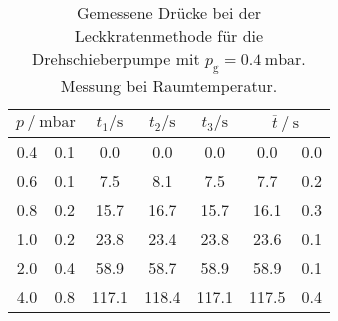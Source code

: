 \begin{table} 
\centering 
\caption{Gemessene Drücke bei der Leckkratenmethode für die Drehschieberpumpe mit $p_{\mathrm{g}}=\SI{0.4}{\milli\bar}$. Messung bei Raumtemperatur.} 
\label{tab: leck_dreh_leck_0.4.pdf} 
\begin{tabular}{S[table-format=1.1]@{${}\pm{}$} S[table-format=1.1] S S S S[table-format=1.1]@{${}\pm{}$} S[table-format=1.1] } 
\toprule  
{} & {$t_1 / \si{ \second}$} & {$t_2 / \si{ \second}$} & {$t_3 / \si{ \second}$} &  \\ 
 & 0.1 & 0.0 & 0.0 & 0.0 & 0.0 & 0.0\\ 
0.6 & 0.1 & 7.5 & 8.1 & 7.5 & 7.7 & 0.2\\ 
0.8 & 0.2 & 15.7 & 16.7 & 15.7 & 16.1 & 0.3\\ 
1.0 & 0.2 & 23.8 & 23.4 & 23.8 & 23.6 & 0.1\\ 
2.0 & 0.4 & 58.9 & 58.7 & 58.9 & 58.9 & 0.1\\ 
4.0 & 0.8 & 117.1 & 118.4 & 117.1 & 117.5 & 0.4\\ 
\bottomrule 
\end{tabular} 
\end{table}
